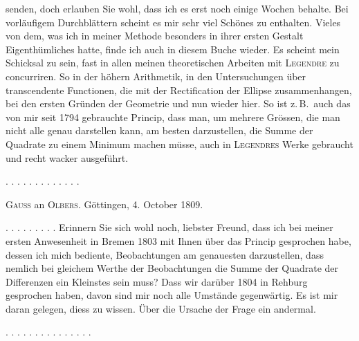 senden, doch erlauben Sie wohl, dass ich es erst noch einige Wochen behalte. Bei vorläufigem Durchblättern scheint es mir sehr viel Schönes zu enthalten. Vieles von dem, was ich in meiner Methode besonders in ihrer ersten Gestalt Eigenthümliches hatte, finde ich auch in diesem Buche wieder. Es scheint mein Schicksal zu sein, fast in allen meinen theoretischen Arbeiten mit \textsc{Legendre} zu concurriren. So in der höhern Arithmetik, in den Untersuchungen über transcendente Functionen, die mit der Rectification der Ellipse zusammenhangen, bei den ersten Gründen der Geometrie und nun wieder hier. So ist z.\,B.\ auch das von mir seit 1794 gebrauchte Princip, dass man, um mehrere Grössen, die man nicht alle genau darstellen kann, am besten darzustellen, die Summe der Quadrate zu einem Minimum machen müsse, auch in \textsc{Legendres} Werke gebraucht und recht wacker ausgeführt.

\begin{center}
. . . . . . . . . . . . .
\end{center}

\begin{center}
\textsc{Gauss} an \textsc{Olbers}. Göttingen, 4. October 1809.
\end{center}

. . . . . . . . . Erinnern Sie sich wohl noch, liebster Freund, dass ich bei meiner ersten Anwesenheit in Bremen 1803 mit Ihnen über das Princip gesprochen habe, dessen ich mich bediente, Beobachtungen am genauesten darzustellen, dass nemlich bei gleichem Werthe der Beobachtungen die Summe der Quadrate der Differenzen ein Kleinstes sein muss? Dass wir darüber 1804 in Rehburg gesprochen haben, davon sind mir noch alle Umstände gegenwärtig. Es ist mir daran gelegen, diess zu wissen. Über die Ursache der Frage ein andermal.

\begin{center}
. . . . . . . . . . . . . . .
\end{center}
